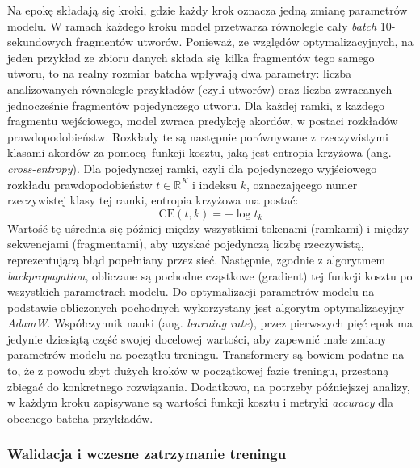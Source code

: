 Na epokę składają się kroki, gdzie każdy krok oznacza jedną zmianę parametrów modelu. W ramach
każdego kroku model przetwarza równolegle cały \emph{batch} 10-sekundowych fragmentów utworów.
Ponieważ, ze względów optymalizacyjnych, na jeden przykład ze zbioru danych składa się kilka
fragmentów tego samego utworu, to na realny rozmiar batcha wpływają dwa parametry: liczba
analizowanych równolegle przykładów (czyli utworów) oraz liczba zwracanych jednocześnie fragmentów
pojedynczego utworu. Dla każdej ramki, z każdego fragmentu wejściowego, model zwraca predykcję akordów, w
postaci rozkładów prawdopodobieństw. Rozkłady te są następnie porównywane z rzeczywistymi klasami
akordów za pomocą funkcji kosztu, jaką jest entropia krzyżowa (ang. \emph{cross-entropy}). Dla
pojedynczej ramki, czyli dla pojedynczego wyjściowego rozkładu prawdopodobieństw $t \in
\mathbb{R}^K$ i indeksu $k$, oznaczającego numer rzeczywistej klasy tej ramki, entropia krzyżowa ma
postać:
\begin{equation}
    \textrm{CE}(t, k) = - \log t_k
\end{equation}
Wartość tę uśrednia się później między wszystkimi tokenami (ramkami) i między sekwencjami
(fragmentami), aby uzyskać pojedynczą liczbę rzeczywistą, reprezentującą błąd popełniany przez sieć.
Następnie, zgodnie z algorytmem \emph{backpropagation}, obliczane są pochodne cząstkowe (gradient)
tej funkcji kosztu po wszystkich parametrach modelu. Do optymalizacji parametrów modelu na podstawie
obliczonych pochodnych wykorzystany jest algorytm optymalizacyjny \emph{AdamW}. Współczynnik nauki
(ang. \emph{learning rate}), przez pierwszych pięć epok ma jedynie dziesiątą część swojej docelowej
wartości, aby zapewnić małe zmiany parametrów modelu na początku treningu. Transformery są bowiem
podatne na to, że z powodu zbyt dużych kroków w początkowej fazie treningu, przestaną zbiegać do
konkretnego rozwiązania. Dodatkowo, na potrzeby późniejszej analizy, w każdym kroku zapisywane są
wartości funkcji kosztu i metryki \emph{accuracy} dla obecnego batcha przykładów.

\subsubsection{Walidacja i wczesne zatrzymanie treningu}

